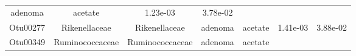 \documentclass[11pt,]{article}
\begin{document}
\begin{longtable}[]{@{}ccccccc@{}}
\begin{minipage}[t]{0.09\columnwidth}
adenoma\strut
\end{minipage} & \begin{minipage}[t]{0.11\columnwidth}\centering\strut
acetate\strut
\end{minipage} & \begin{minipage}[t]{0.09\columnwidth}\centering\strut
1.23e-03\strut
\end{minipage} & \begin{minipage}[t]{0.09\columnwidth}\centering\strut
3.78e-02\strut
\end{minipage}\tabularnewline
\begin{minipage}[t]{0.09\columnwidth}\centering\strut
Otu00277\strut
\end{minipage} & \begin{minipage}[t]{0.17\columnwidth}\centering\strut
Rikenellaceae\strut
\end{minipage} & \begin{minipage}[t]{0.17\columnwidth}\centering\strut
Rikenellaceae\strut
\end{minipage} & \begin{minipage}[t]{0.09\columnwidth}\centering\strut
adenoma\strut
\end{minipage} & \begin{minipage}[t]{0.11\columnwidth}\centering\strut
acetate\strut
\end{minipage} & \begin{minipage}[t]{0.09\columnwidth}\centering\strut
1.41e-03\strut
\end{minipage} & \begin{minipage}[t]{0.09\columnwidth}\centering\strut
3.88e-02\strut
\end{minipage}\tabularnewline
\begin{minipage}[t]{0.09\columnwidth}\centering\strut
Otu00349\strut
\end{minipage} & \begin{minipage}[t]{0.17\columnwidth}\centering\strut
Ruminococcaceae\strut
\end{minipage} & \begin{minipage}[t]{0.17\columnwidth}\centering\strut
Ruminococcaceae\strut
\end{minipage} & \begin{minipage}[t]{0.09\columnwidth}\centering\strut
adenoma\strut
\end{minipage} & \begin{minipage}[t]{0.11\columnwidth}\centering\strut
acetate\strut
\end{minipage} & \begin{minipage}[t]{0.09\columnwidth}\centering\strut

\end{minipage}
\end{longtable}
\end{document}
